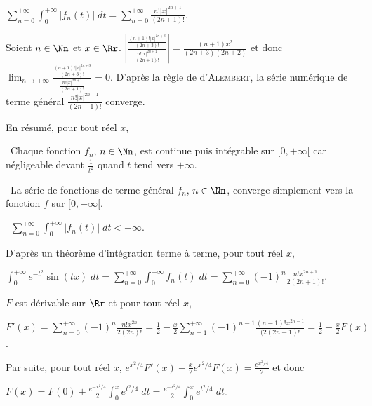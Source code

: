 {{\begin{center}
$\sum_{n=0}^{+\infty}\int_{0}^{+\infty}|f_n(t)|\;dt=\sum_{n=0}^{+\infty}\frac{n!|x|^{2n+1}}{(2n+1)!}$.
\end{center}

Soient $n\in\Nn$ et $x\in\Rr$. $\left|\frac{\frac{(n+1)!|x|^{2n+3}}{(2n+3)!}}{\frac{n!|x|^{2n+1}}{(2n+1)!}}\right|=\frac{(n+1)x^2}{(2n+3)(2n+2)}$ et donc $\lim_{n \rightarrow +\infty}\frac{\frac{(n+1)!|x|^{2n+3}}{(2n+3)!}}{\frac{n!|x|^{2n+1}}{(2n+1)!}}=0$. D'après la règle de d'\textsc{Alembert}, la série numérique de terme général $\frac{n!|x|^{2n+1}}{(2n+1)!}$ converge.

En résumé, pour tout réel $x$,

\textbullet~Chaque fonction $f_n$, $n\in\Nn$, est continue puis intégrable sur $[0,+\infty[$ car négligeable devant $\frac{1}{t^2}$ quand $t$ tend vers $+\infty$.

\textbullet~La série de fonctions de terme général $f_n$, $n\in\Nn$, converge simplement vers la fonction $f$ sur $[0,+\infty[$.

\textbullet~$\sum_{n=0}^{+\infty}\int_{0}^{+\infty}|f_n(t)|\;dt<+\infty$.

D'après un théorème d'intégration terme à terme, pour tout réel $x$,

\begin{center}
$\int_{0}^{+\infty}e^{-t^2}\sin(tx)\;dt=\sum_{n=0}^{+\infty}\int_{0}^{+\infty}f_n(t)\;dt=\sum_{n=0}^{+\infty}(-1)^n\frac{n!x^{2n+1}}{2(2n+1)!}$.
\end{center}

\begin{center}
\end{center}

$F$ est dérivable sur $\Rr$ et pour tout réel $x$,

\begin{center}
$F'(x)=\sum_{n=0}^{+\infty}(-1)^n\frac{n!x^{2n}}{2(2n)!}=\frac{1}{2}-\frac{x}{2}\sum_{n=1}^{+\infty}(-1)^{n-1}\frac{(n-1)!x^{2n-1}}{(2(2n-1)!}=\frac{1}{2}-\frac{x}{2}F(x)$.
\end{center}

Par suite, pour tout réel $x$, $e^{x^2/4}F'(x) +\frac{x}{2}e^{x^2/4}F(x)=\frac{e^{x^2/4}}{2}$ et donc

\begin{center}
$F(x)=F(0)+\frac{e^{-x^2/4}}{2}\int_{0}^{x}e^{t^2/4}\;dt =\frac{e^{-x^2/4}}{2}\int_{0}^{x}e^{t^2/4}\;dt$.
\end{center}

\begin{center}
\end{center}}
}